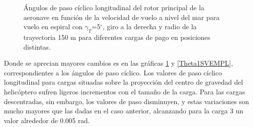 \begin{figure}
	\centering
	\caption{Ángulos de paso cíclico longitudinal del rotor principal de la aeronave en función de la velocidad de vuelo a nivel del mar para vuelo en espiral con $\gamma_T$=5$^\circ$, giro a la derecha y radio de la trayectoria 150 m para diferentes cargas de pago en posiciones distintas.}
	\label{Theta1CVEMPL}
\end{figure}

Donde se aprecian mayores cambios es en las gráficas \ref{Theta1CVEMPL} y \ref{Theta1SVEMPL}, correspondientes a los ángulos de paso cíclico. Los valores de paso cíclico longitudinal para cargas situadas sobre la proyección del centro de gravedad del helicóptero sufren ligeros incrementos con el tamaño de la carga. Para las cargas descentradas, sin embargo, los valores de paso disminuyen, y estas variaciones son mucho mayores que las dadas en el caso anterior, alcanzando para la carga 3 un valor alrededor de 0.005 rad.

